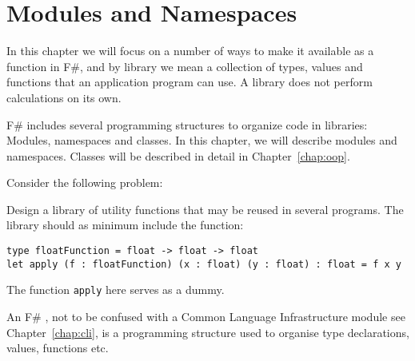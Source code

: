 \chapter{Modules and Namespaces}
\label{chap:modules}
In this chapter we will focus on a number of ways to make it available as a  function in F\#, and by library we mean a collection of types, values and functions that an application program can use. A library does not perform calculations on its own.

F\# includes several programming structures to organize code in libraries: Modules, namespaces and classes. In this chapter, we will describe modules and namespaces. Classes will be described in detail in Chapter~\ref{chap:oop}.

Consider the following problem:
\begin{problem}
  Design a library of utility functions that may be reused in several programs. The library should as minimum include the function:
\begin{lstlisting}[numbers=none]
type floatFunction = float -> float -> float
let apply (f : floatFunction) (x : float) (y : float) : float = f x y
\end{lstlisting}
\end{problem}
The function \lstinline{apply} here serves as a dummy. 

An F\# , not to be confused with a Common Language Infrastructure module see Chapter~\ref{chap:cli}, is a programming structure used to organise type declarations, values, functions etc. 


